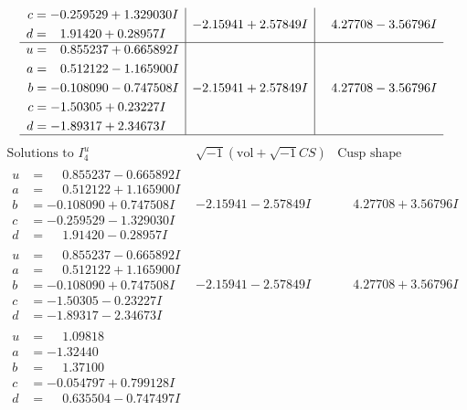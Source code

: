 \documentclass[1p]{elsarticle_modified}
\theoremstyle{definition}
\newcommand{\I}{\sqrt{-1}}
\begin{document}
$$\begin{array}{c|c|c}
\begin{aligned}
c &= -0.259529 + 1.329030 I \\
d &= \phantom{-}1.91420 + 0.28957 I\end{aligned}
 & -2.15941 + 2.57849 I & \phantom{-}4.27708 - 3.56796 I \\ \hline\begin{aligned}
u &= \phantom{-}0.855237 + 0.665892 I \\
a &= \phantom{-}0.512122 - 1.165900 I \\
b &= -0.108090 - 0.747508 I \\
c &= -1.50305 + 0.23227 I \\
d &= -1.89317 + 2.34673 I\end{aligned}
 & -2.15941 + 2.57849 I & \phantom{-}4.27708 - 3.56796 I\\
 \hline 
 \end{array}$$\newpage$$\begin{array}{c|c|c}  
\text{Solutions to }I^u_{4}& \I (\text{vol} + \sqrt{-1}CS) & \text{Cusp shape}\\
 \hline 
\begin{aligned}
u &= \phantom{-}0.855237 - 0.665892 I \\
a &= \phantom{-}0.512122 + 1.165900 I \\
b &= -0.108090 + 0.747508 I \\
c &= -0.259529 - 1.329030 I \\
d &= \phantom{-}1.91420 - 0.28957 I\end{aligned}
 & -2.15941 - 2.57849 I & \phantom{-}4.27708 + 3.56796 I \\ \hline\begin{aligned}
u &= \phantom{-}0.855237 - 0.665892 I \\
a &= \phantom{-}0.512122 + 1.165900 I \\
b &= -0.108090 + 0.747508 I \\
c &= -1.50305 - 0.23227 I \\
d &= -1.89317 - 2.34673 I\end{aligned}
 & -2.15941 - 2.57849 I & \phantom{-}4.27708 + 3.56796 I \\ \hline\begin{aligned}
u &= \phantom{-}1.09818\phantom{ +0.000000I} \\
a &= -1.32440\phantom{ +0.000000I} \\
b &= \phantom{-}1.37100\phantom{ +0.000000I} \\
c &= -0.054797 + 0.799128 I \\
d &= \phantom{-}0.635504 - 0.747497 I\end{aligned}

\end{array}$$
\end{document}
